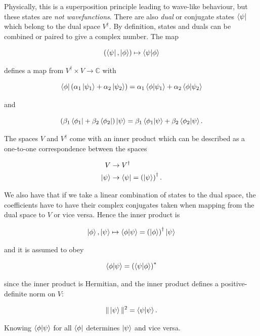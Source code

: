 \documentclass{article}
\begin{document}
Physically, this is a superposition principle leading to wave-like behaviour, but these states are \textit{not wavefunctions}. There are also \textit{dual} or conjugate states $\bra{\psi}$ which belong to the dual space $V^\dagger$. By definition, states and duals can be combined or paired to give a complex number. The map

\[
    (\bra{\psi}, \ket{\phi}) \mapsto \bra{\psi}\ket{\phi}
\]

defines a map from $V^\dagger \times V \to \mathbb{C}$ with

\[
    \bra{\phi}
    \left(\alpha_1\ket{\psi_1}+\alpha_2\ket{\psi_2}\right)
    =
    \alpha_1\bra{\phi}\ket{\psi_1}
    +
    \alpha_2\bra{\phi}\ket{\psi_2}
\]

and

\[
    \left(\beta_1\bra{\phi_1}+\beta_2\bra{\phi_2}\right)\ket{\psi}
    =
    \beta_1\bra{\phi_1}\ket{\psi}
    +
    \beta_2\bra{\phi_2}\ket{\psi}.
\]

The spaces $V$ and $V^\dagger$ come with an inner product which can be described as a one-to-one correspondence between the spaces

\begin{align*}
    V &\to V^\dagger \\
    \ket{\psi} &\to \bra{\psi}
    = \left(\ket{\psi}\right)^\dagger.
\end{align*}

We also have that if we take a linear combination of states to the dual space, the coefficients have to have their complex conjugates taken when mapping from the dual space to $V$ or vice versa. Hence the inner product is

\[
    \ket{\phi},\ket{\psi}
    \mapsto
    \bra{\phi}\ket{\psi}
    =
    \left(\ket{\phi}\right)^\dagger\ket{\psi}
\]

and it is assumed to obey

\[
    \bra{\phi}\ket{\psi}
    =
    \left(\bra{\psi}\ket{\phi}\right)^*
\]

since the inner product is Hermitian, and the inner product defines a positive-definite norm on $V$:

\[
    \|\ket{\psi}\|^2 = \bra{\psi}\ket{\psi}.
\]

\begin{remark}

    Knowing $\bra{\phi}\ket{\psi}$ for all $\bra{\phi}$ determines $\ket{\psi}$ and vice versa.

\end{remark}
\end{document}
